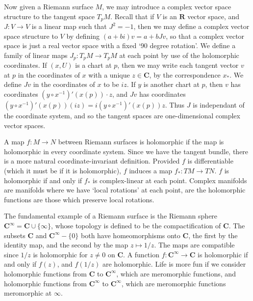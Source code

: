 Now given a Riemann surface $M$, we may introduce a complex vector space structure to the tangent space $T_p M$. Recall that if $V$ is an $\mathbf{R}$ vector space, and $J: V \to V$ is a linear map such that $J^2 = -1$, then we may define a complex vector space structure to $V$ by defining $(a + bi)v = a + bJv$, so that a complex vector space is just a real vector space with a fixed `90 degree rotation'. We define a family of linear maps $J_p: T_p M \to T_p M$ at each point by use of the holomorphic coordinates. If $(x,U)$ is a chart at $p$, then we may write each tangent vector $v$ at $p$ in the coordinates of $x$ with a unique $z \in \mathbf{C}$, by the correspondence $x_*$. We define $Jv$ in the coordinates of $x$ to be $iz$. If $y$ is another chart at $p$, then $v$ has coordinates $(y \circ x^{-1})'(x(p)) \cdot z$, and $Jv$ has coordinates $(y \circ x^{-1})'(x(p))(iz) = i(y \circ x^{-1})'(x(p)) z$. Thus $J$ is independant of the coordinate system, and so the tangent spaces are one-dimensional complex vector spaces.

A map $f: M \to N$ between Riemann surfaces is holomorphic if the map is holomorphic in every coordinate system. Since we have the tangent bundle, there is a more natural coordinate-invariant definition. Provided $f$ is differentiable (which it must be if it is holomorphic), $f$ induces a map $f_*: TM \to TN$. $f$ is holomorphic if and only if $f_*$ is complex-linear at each point. Complex manifolds are manifolds where we have `local rotations' at each point, are the holomorphic functions are those which preserve local rotations.

\begin{example}
    The fundamental example of a Riemann surface is the Riemann sphere $\mathbf{C}^\infty = \mathbf{C} \cup \{ \infty \}$, whose topology is defined to be the compactification of $\mathbf{C}$. The subsets $\mathbf{C}$ and $\mathbf{C}^\infty - \{ 0 \}$ both have homeomorphisms onto $\mathbf{C}$, the first by the identity map, and the second by the map $z \mapsto 1/z$. The maps are compatible since $1/z$ is holomorphic for $z \neq 0$ on $\mathbf{C}$. A function $f: \mathbf{C}^\infty \to \mathbf{C}$ is holomorphic if and only if $f(z)$, and $f(1/z)$ are holomorphic. Life is more fun if we consider holomorphic functions from $\mathbf{C}$ to $\mathbf{C}^\infty$, which are meromorphic functions, and holomorphic functions from $\mathbf{C}^\infty$ to $\mathbf{C}^\infty$, which are meromorphic functions meromorphic at $\infty$.
\end{example}

